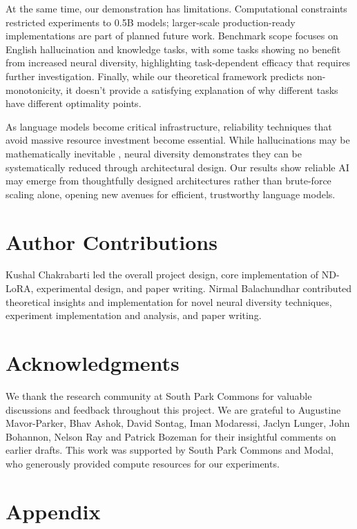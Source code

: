 \documentclass{article} %
\begin{document}
At the same time, our demonstration has limitations. Computational constraints restricted experiments
to 0.5B models; larger-scale production-ready implementations are part of planned future work. Benchmark
scope focuses on English hallucination and knowledge tasks, with some tasks showing no benefit from increased
neural diversity, highlighting task-dependent efficacy that requires further investigation. Finally, while
our theoretical framework predicts non-monotonicity, it doesn't provide a satisfying explanation of why
different tasks have different optimality points.

As language models become critical infrastructure, reliability techniques that avoid massive resource investment
become essential. While hallucinations may be mathematically inevitable \citep{kalai2024calibrated}, neural diversity
demonstrates they can be systematically reduced through architectural design. Our results show reliable AI may
emerge from thoughtfully designed architectures rather than brute-force scaling alone, opening new avenues for
efficient, trustworthy language models.

\section*{Author Contributions}
Kushal Chakrabarti led the overall project design, core implementation of ND-LoRA, experimental design, and
paper writing. Nirmal Balachundhar contributed theoretical insights and implementation for novel neural
diversity techniques, experiment implementation and analysis, and paper writing.

\section*{Acknowledgments}
We thank the research community at South Park Commons for valuable discussions and feedback throughout this
project. We are grateful to Augustine Mavor-Parker, Bhav Ashok, David Sontag, Iman Modaressi, Jaclyn Lunger,
John Bohannon, Nelson Ray and Patrick Bozeman for their insightful comments on earlier drafts. This work was
supported by South Park Commons and Modal, who generously provided compute resources for our experiments.




\appendix
\section{Appendix}
\end{document}
